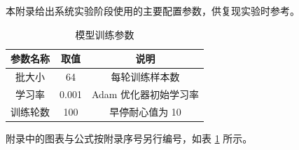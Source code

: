 
本附录给出系统实验阶段使用的主要配置参数，供复现实验时参考。

\begin{table}[htbp]
  \centering
  \caption{模型训练参数}
  \label{tab:appa-param}
  \begin{tabular}{@{}ccc@{}}
    \toprule
    参数名称 & 取值 & 说明 \\
    \midrule
    批大小 & 64 & 每轮训练样本数 \\
    学习率 & 0.001 & Adam 优化器初始学习率 \\
    训练轮数 & 100 & 早停耐心值为 10 \\
    \bottomrule
  \end{tabular}
\end{table}

附录中的图表与公式按附录序号另行编号，如表 \ref{tab:appa-param} 所示。
